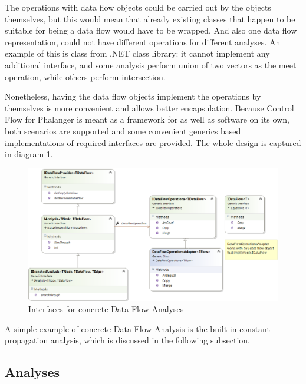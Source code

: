         The operations with data flow objects could be carried out by the 
        objects themselves, but this would mean that already existing 
        classes that happen to be suitable for being a data flow would 
        have to be wrapped. And also one data flow representation, could 
        not have different operations for different analyses. An example 
        of this is  class from .NET class library: it 
        cannot implement any additional interface, and some analysis 
        perform union of two vectors as the meet operation, while 
        others perform intersection.
        
        Nonetheless, having the data flow objects implement the operations by 
        themselves is more convenient and allows better encapsulation. 
        Because Control Flow for Phalanger is meant as a framework for as 
        well as software on its own, both scenarios are supported and 
        some convenient generics based implementations of required 
        interfaces are provided. The whole design is captured in 
        diagram \ref{dataflowifaces}.
        
\begin{figure}[h]  
  \centering
    \includegraphics*[width=\textwidth,height=\textheight,keepaspectratio]{img/dataflow-ifaces.png}  
    \caption{Interfaces for concrete Data Flow Analyses\label{dataflowifaces}}
\end{figure}

        A simple example of concrete Data Flow Analysis is the built-in 
        constant propagation analysis, which is discussed in the 
        following subsection.        
    
    \subsection{Analyses}
